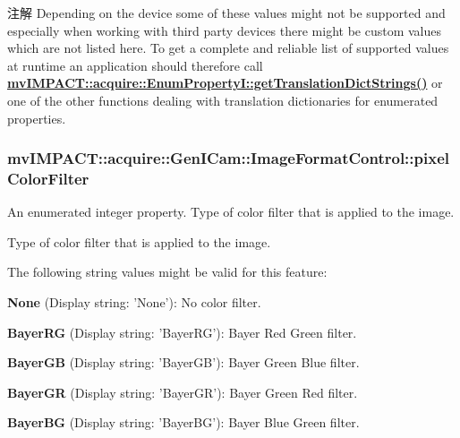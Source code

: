 \begin{DoxyNote}{注解}
Depending on the device some of these values might not be supported and especially when working with third party devices there might be custom values which are not listed here. To get a complete and reliable list of supported values at runtime an application should therefore call {\bfseries \hyperlink{classmv_i_m_p_a_c_t_1_1acquire_1_1_enum_property_i_a0ba6ccbf5ee69784d5d0b537924d26b6}{mv\+I\+M\+P\+A\+C\+T\+::acquire\+::\+Enum\+Property\+I\+::get\+Translation\+Dict\+Strings()}} or one of the other functions dealing with translation dictionaries for enumerated properties. 
\end{DoxyNote}
\hypertarget{classmv_i_m_p_a_c_t_1_1acquire_1_1_gen_i_cam_1_1_image_format_control_a4c2b95c8ec6a3310fe5203ad1146fa41}{
\subsubsection[{pixel\+Color\+Filter}]{ mv\+I\+M\+P\+A\+C\+T\+::acquire\+::\+Gen\+I\+Cam\+::\+Image\+Format\+Control\+::pixel\+Color\+Filter}}\label{classmv_i_m_p_a_c_t_1_1acquire_1_1_gen_i_cam_1_1_image_format_control_a4c2b95c8ec6a3310fe5203ad1146fa41}


An enumerated integer property. Type of color filter that is applied to the image. 

Type of color filter that is applied to the image.

The following string values might be valid for this feature\+:
\begin{DoxyItemize}
\item {\bfseries None} (Display string\+: 'None')\+: No color filter.
\item {\bfseries Bayer\+R\+G} (Display string\+: 'Bayer\+R\+G')\+: Bayer Red Green filter.
\item {\bfseries Bayer\+G\+B} (Display string\+: 'Bayer\+G\+B')\+: Bayer Green Blue filter.
\item {\bfseries Bayer\+G\+R} (Display string\+: 'Bayer\+G\+R')\+: Bayer Green Red filter.
\item {\bfseries Bayer\+B\+G} (Display string\+: 'Bayer\+B\+G')\+: Bayer Blue Green filter.
\end{DoxyItemize}

